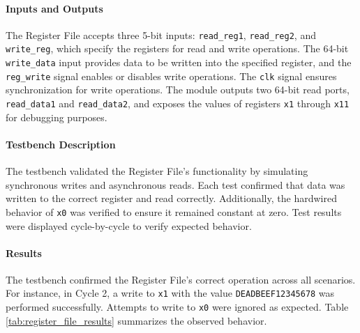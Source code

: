 \documentclass[12pt]{article}
\begin{document}
\paragraph{Inputs and Outputs}
The Register File accepts three 5-bit inputs: \texttt{read\_reg1}, \texttt{read\_reg2}, and \texttt{write\_reg}, which specify the registers for read and write operations. The 64-bit \texttt{write\_data} input provides data to be written into the specified register, and the \texttt{reg\_write} signal enables or disables write operations. The \texttt{clk} signal ensures synchronization for write operations. The module outputs two 64-bit read ports, \texttt{read\_data1} and \texttt{read\_data2}, and exposes the values of registers \texttt{x1} through \texttt{x11} for debugging purposes.

\paragraph{Testbench Description}
The testbench validated the Register File's functionality by simulating synchronous writes and asynchronous reads. Each test confirmed that data was written to the correct register and read correctly. Additionally, the hardwired behavior of \texttt{x0} was verified to ensure it remained constant at zero. Test results were displayed cycle-by-cycle to verify expected behavior.

\paragraph{Results}
The testbench confirmed the Register File's correct operation across all scenarios. For instance, in Cycle 2, a write to \texttt{x1} with the value \texttt{DEADBEEF12345678} was performed successfully. Attempts to write to \texttt{x0} were ignored as expected. Table \ref{tab:register_file_results} summarizes the observed behavior.
\end{document}
